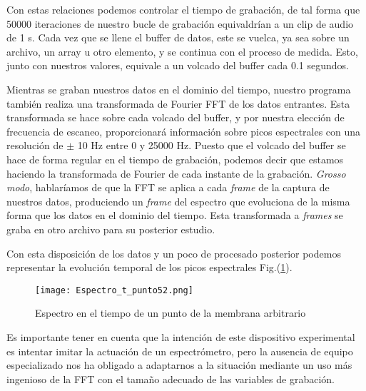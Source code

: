 \documentclass[journal, a4paper,onecolumn]{IEEEtran}
\newcommand{\figref}[1]{Fig.(\ref{#1})}
\begin{document}
Con estas relaciones podemos controlar el tiempo de grabación, de tal forma que 50000 iteraciones de nuestro bucle de grabación equivaldrían a un clip de audio de 1 s.
Cada vez que se llene el buffer de datos, este se vuelca, ya sea sobre un archivo, un array u otro elemento, y se continua con el proceso de medida. Esto, junto con nuestros valores, equivale a un volcado del buffer cada 0.1 segundos.
\newline 

Mientras se graban nuestros datos en el dominio del tiempo, nuestro programa también realiza una transformada de Fourier FFT de los datos entrantes. Esta transformada se hace sobre cada volcado del buffer, y por nuestra elección de frecuencia de escaneo, proporcionará información sobre picos espectrales con una resolución de $\pm$ 10 Hz entre 0 y 25000 Hz. Puesto que el volcado del buffer se hace de forma regular en el tiempo de grabación, podemos decir que estamos haciendo la transformada de Fourier de cada instante de la grabación.
\textit{Grosso modo}, hablaríamos de que la FFT se aplica a cada \textit{frame} de la captura de nuestros datos, produciendo un \textit{frame} del espectro que evoluciona de la misma forma que los datos en el dominio del tiempo. Esta transformada a \textit{frames} se graba en otro archivo para su posterior estudio. \newline

Con esta disposición de los datos y un poco de procesado posterior podemos representar la evolución temporal de los picos espectrales \figref{espectro_t_arbitrario}.\newline %

\begin{figure}[H]
    \centering
    \texttt{[image: Espectro\_t\_punto52.png]}
    \caption{Espectro en el tiempo de un punto de la membrana arbitrario}
\label{espectro_t_arbitrario}
\end{figure}

Es importante tener en cuenta que la intención de este dispositivo experimental es intentar imitar la actuación de un espectrómetro, pero la ausencia de equipo especializado nos ha obligado a adaptarnos a la situación mediante un uso más ingenioso de la FFT con el tamaño adecuado de las variables de grabación.\newline
\end{document}
